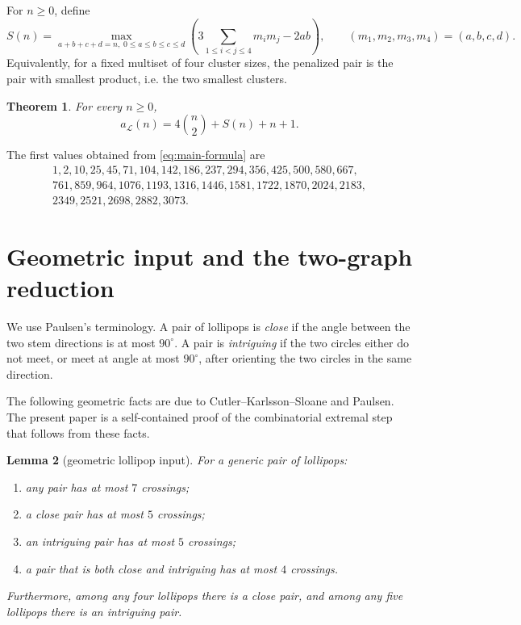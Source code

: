 \documentclass[12pt]{article}
\theoremstyle{plain}
\newtheorem{theorem}{Theorem}
\newtheorem{lemma}[theorem]{Lemma}
\theoremstyle{definition}
\theoremstyle{remark}
\newcommand{\Lop}{\mathcal L}
\begin{document}
For \(n\ge0\), define
\begin{equation}\label{eq:Sdef}
  S(n)=\max_{a+b+c+d=n,\;0\le a\le b\le c\le d}
  \left(3\sum_{1\le i<j\le4}m_i m_j-2ab\right),
  \qquad (m_1,m_2,m_3,m_4)=(a,b,c,d).
\end{equation}
Equivalently, for a fixed multiset of four cluster sizes, the penalized pair is
the pair with smallest product, i.e. the two smallest clusters.

\begin{theorem}\label{thm:lollipop-formula}
For every \(n\ge0\),
\begin{equation}\label{eq:main-formula}
  a_{\Lop}(n)=4\binom n2+S(n)+n+1.
\end{equation}
\end{theorem}

The first values obtained from \eqref{eq:main-formula} are
\[
\begin{gathered}
1,2,10,25,45,71,104,142,186,237,294,356,425,500,580,667,\\
761,859,964,1076,1193,1316,1446,1581,1722,1870,2024,2183,\\
2349,2521,2698,2882,3073.
\end{gathered}
\]

\section{Geometric input and the two-graph reduction}

We use Paulsen's terminology.  A pair of lollipops is \emph{close} if the
angle between the two stem directions is at most \(90^\circ\).  A pair is
\emph{intriguing} if the two circles either do not meet, or meet at angle at
most \(90^\circ\), after orienting the two circles in the same direction.

The following geometric facts are due to Cutler--Karlsson--Sloane and Paulsen.
The present paper is a self-contained proof of the combinatorial extremal step
that follows from these facts.

\begin{lemma}[geometric lollipop input]\label{lem:geometry}
For a generic pair of lollipops:
\begin{enumerate}[label=(\roman*)]
  \item any pair has at most \(7\) crossings;
  \item a close pair has at most \(5\) crossings;
  \item an intriguing pair has at most \(5\) crossings;
  \item a pair that is both close and intriguing has at most \(4\) crossings.
\end{enumerate}
Furthermore, among any four lollipops there is a close pair, and among any five
lollipops there is an intriguing pair.
\end{lemma}
\end{document}
